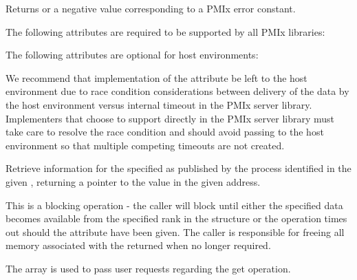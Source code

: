 \begin{arglist}
\end{arglist}

Returns  or a negative value corresponding to a PMIx error constant.

\reqattrstart
The following attributes are required to be supported by all \ac{PMIx} libraries:


\reqattrend

\optattrstart
The following attributes are optional for host environments:


\optattrend

\adviceimplstart
We recommend that implementation of the  attribute be left to the host environment due to race condition considerations between delivery of the data by the host environment versus internal timeout in the \ac{PMIx} server library. Implementers that choose to support  directly in the \ac{PMIx} server library must take care to resolve the race condition and should avoid passing  to the host environment so that multiple competing timeouts are not created.
\adviceimplend

\descr

Retrieve information for the specified  as published by the process identified in the given , returning a pointer to the value in the given address.

This is a blocking operation - the caller will block until either the specified data becomes available from the specified rank in the  structure or the operation times out should the  attribute have been given.
The caller is responsible for freeing all memory associated with the returned  when no longer required.

The  array is used to pass user requests regarding the get operation.

